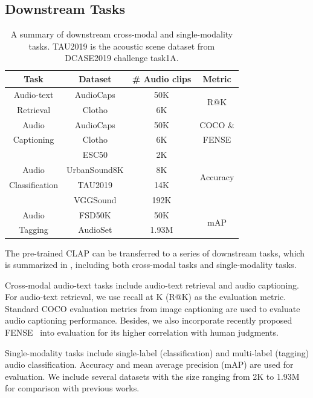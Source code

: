 \documentclass[sigconf,anonymous,review]{acmart}
\begin{document}
\subsection{Downstream Tasks}

\begin{table}[ht]
    \centering
    \begin{tabular}{cccc}
    \toprule
    Task & Dataset & \# Audio clips & Metric \\
    \midrule
    Audio-text & AudioCaps & 50K & \multirow{2}{*}{R@K} \\
    Retrieval & Clotho & 6K & \\
    \hline
    Audio & AudioCaps & 50K & COCO \&  \\
    Captioning & Clotho & 6K & FENSE \\
    \hline
     & ESC50 & 2K & \multirow{4}{*}{Accuracy}\\
    Audio & UrbanSound8K & 8K & \\
    Classification & TAU2019 & 14K & \\
     & VGGSound & 192K & \\
    \hline
    Audio & FSD50K & 50K & \multirow{2}{*}{mAP}\\
    Tagging & AudioSet & 1.93M & \\
    \bottomrule
    \end{tabular}
    \caption{A summary of downstream cross-modal and single-modality tasks. TAU2019 is the acoustic scene dataset from DCASE2019 challenge task1A.}
    \label{tab:task_summary}
\end{table}

The pre-trained CLAP can be transferred to a series of downstream tasks, which is summarized in , including both cross-modal tasks and single-modality tasks.

Cross-modal audio-text tasks include audio-text retrieval and audio captioning.
For audio-text retrieval, we use recall at K (R@K) as the evaluation metric.
Standard COCO evaluation metrics from image captioning are used to evaluate audio captioning performance.
Besides, we also incorporate recently proposed FENSE~\cite{zhou2021can} into evaluation for its higher correlation with human judgments.

Single-modality tasks include single-label (classification) and multi-label (tagging) audio classification.
Accuracy and mean average precision (mAP) are used for evaluation.
We include several datasets with the size ranging from 2K to 1.93M for comparison with previous works.
\end{document}
